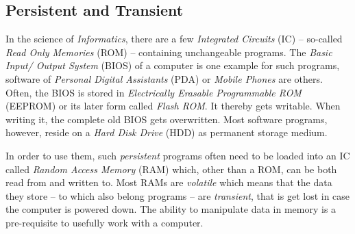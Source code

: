 %
%
%
%
%
%
%

\subsection{Persistent and Transient}
\label{persistent_and_transient_heading}

In the science of \emph{Informatics}, there are a few \emph{Integrated Circuits}
(IC) -- so-called \emph{Read Only Memories} (ROM) -- containing unchangeable
programs. The \emph{Basic Input/ Output System} (BIOS) of a computer is one
example for such programs, software of \emph{Personal Digital Assistants} (PDA)
or \emph{Mobile Phones} are others. Often, the BIOS is stored in
\emph{Electrically Erasable Programmable ROM} (EEPROM) or its later form called
\emph{Flash ROM}. It thereby gets writable. When writing it, the complete old
BIOS gets overwritten. Most software programs, however, reside on a
\emph{Hard Disk Drive} (HDD) as permanent storage medium.

In order to use them, such \emph{persistent} programs often need to be loaded
into an IC called \emph{Random Access Memory} (RAM) which, other than a ROM,
can be both read from and written to. Most RAMs are \emph{volatile} which means
that the data they store -- to which also belong programs -- are
\emph{transient}, that is get lost in case the computer is powered down. The
ability to manipulate data in memory is a pre-requisite to usefully work with a
computer.

